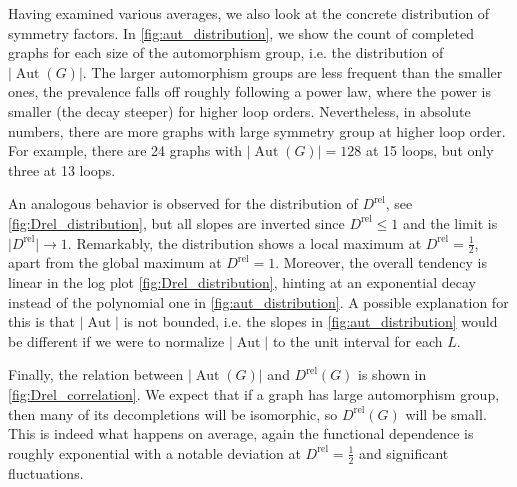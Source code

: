 \documentclass[11pt,a4paper]{article}
\newcommand{\abs}[1]{\lvert #1 \rvert}
\newcommand{\Aut}{\operatorname{Aut}}
\renewcommand{\|}{\rule[-0.4ex]{0.2ex}{1.2em}}
\begin{document}
Having examined various averages, we also look at the concrete distribution of symmetry factors.
In \cref{fig:aut_distribution}, we show the count of completed graphs for each size of the automorphism group, i.e. the distribution of $\abs{\Aut(G)}$. The larger automorphism groups are less frequent than the smaller ones, the prevalence falls off roughly following a power law, where the power is smaller (the decay steeper) for higher loop orders. Nevertheless, in absolute numbers, there are more graphs with large symmetry group at higher loop order. For example, there are 24 graphs with $\abs{\Aut(G)}=128$ at 15 loops, but only three at 13 loops.

An analogous behavior is observed for the distribution of $D^\text{rel}$, see \cref{fig:Drel_distribution}, but all slopes are inverted since $D^\text{rel} \leq 1$ and the limit is $\abs{D^\text{rel}} \rightarrow 1$. Remarkably, the distribution shows a local maximum at $D^\text{rel}=\frac 12$, apart from the global maximum at $D^\text{rel}=1$. Moreover, the overall tendency is linear in the log plot \cref{fig:Drel_distribution}, hinting at an exponential decay instead of the polynomial one in \cref{fig:aut_distribution}. A possible explanation for this is that $\abs{\Aut}$ is not bounded, i.e. the slopes in \cref{fig:aut_distribution} would be different if we were to normalize $\abs{\Aut}$ to the unit interval for each $L$.

Finally, the relation between $\abs{\Aut(G)}$ and $D^\text{rel}(G)$ is shown in \cref{fig:Drel_correlation}. We expect that if a graph has large automorphism group, then many of its decompletions will be isomorphic, so $D^\text{rel}(G)$ will be small. This is indeed what happens on average, again the functional dependence is roughly exponential with a notable deviation at $D^\text{rel}=\frac 12$ and significant fluctuations.
\end{document}
